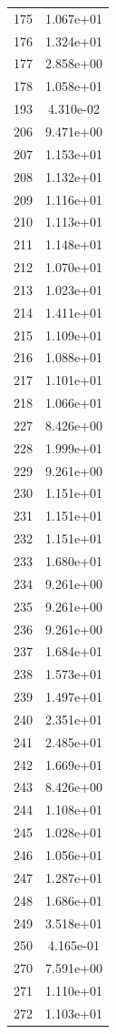 \documentclass[12pt]{article}
\begin{document}
\begin{longtable}{@{}cc@{}}
175 & 1.067e+01 \\
176 & 1.324e+01 \\
177 & 2.858e+00 \\
178 & 1.058e+01 \\
193 & 4.310e-02 \\
206 & 9.471e+00 \\
207 & 1.153e+01 \\
208 & 1.132e+01 \\
209 & 1.116e+01 \\
210 & 1.113e+01 \\
211 & 1.148e+01 \\
212 & 1.070e+01 \\
213 & 1.023e+01 \\
214 & 1.411e+01 \\
215 & 1.109e+01 \\
216 & 1.088e+01 \\
217 & 1.101e+01 \\
218 & 1.066e+01 \\
227 & 8.426e+00 \\
228 & 1.999e+01 \\
229 & 9.261e+00 \\
230 & 1.151e+01 \\
231 & 1.151e+01 \\
232 & 1.151e+01 \\
233 & 1.680e+01 \\
234 & 9.261e+00 \\
235 & 9.261e+00 \\
236 & 9.261e+00 \\
237 & 1.684e+01 \\
238 & 1.573e+01 \\
239 & 1.497e+01 \\
240 & 2.351e+01 \\
241 & 2.485e+01 \\
242 & 1.669e+01 \\
243 & 8.426e+00 \\
244 & 1.108e+01 \\
245 & 1.028e+01 \\
246 & 1.056e+01 \\
247 & 1.287e+01 \\
248 & 1.686e+01 \\
249 & 3.518e+01 \\
250 & 4.165e-01 \\
270 & 7.591e+00 \\
271 & 1.110e+01 \\
272 & 1.103e+01 \\

\end{longtable}
\end{document}
